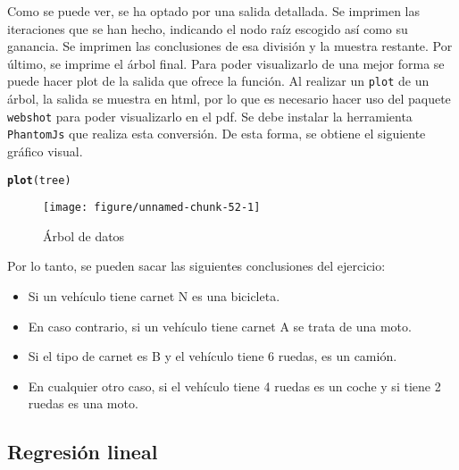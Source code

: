 \documentclass[12pt]{report}\usepackage[]{graphicx}\usepackage[dvipsnames]{xcolor}
\makeatletter
\def\maxwidth{ %
  \ifdim\Gin@nat@width>\linewidth
    \linewidth
  \else
    \Gin@nat@width
  \fi
}
\newcommand{\hlstd}[1]{\textcolor[rgb]{0.345,0.345,0.345}{#1}}%
\newcommand{\hlkwd}[1]{\textcolor[rgb]{0.737,0.353,0.396}{\textbf{#1}}}%
\newenvironment{kframe}{%
 \def\at@end@of@kframe{}%
 \ifinner\ifhmode%
  \def\at@end@of@kframe{\end{minipage}}%
  \begin{minipage}{\columnwidth}%
 \fi\fi%
 \def\FrameCommand##1{\hskip\@totalleftmargin \hskip-\fboxsep
 \colorbox{shadecolor}{##1}\hskip-\fboxsep
     \hskip-\linewidth \hskip-\@totalleftmargin \hskip\columnwidth}%
 \MakeFramed {\advance\hsize-\width
   \@totalleftmargin\z@ \linewidth\hsize
   \@setminipage}}%
 {\par\unskip\endMakeFramed%
 \at@end@of@kframe}
\newenvironment{knitrout}{}{} %
\makeatother
\begin{document}
	 			Como se puede ver, se ha optado por una salida detallada. Se imprimen las iteraciones que se han hecho, indicando el nodo raíz escogido así como su ganancia. Se imprimen las conclusiones de esa división y la muestra restante. Por último, se imprime el árbol final. Para poder visualizarlo de una mejor forma se puede hacer plot de la salida que ofrece la función. Al realizar un \texttt{plot} de un árbol, la salida se muestra en html, por lo que es necesario hacer uso del paquete \texttt{webshot} para poder visualizarlo en el pdf. Se debe instalar la herramienta \texttt{PhantomJs} que realiza esta conversión. De esta forma, se obtiene el siguiente gráfico visual.
	 			
\begin{knitrout}
\color{fgcolor}\begin{kframe}
\begin{alltt}
\hlkwd{plot}\hlstd{(tree)}
\end{alltt}
\end{kframe}\begin{figure}[H]

{\centering \texttt{[image: figure/unnamed-chunk-52-1]} 

}

\caption[Árbol de datos]{Árbol de datos}\label{fig:unnamed-chunk-52}
\end{figure}

\end{knitrout}
	 			
	 			Por lo tanto, se pueden sacar las siguientes conclusiones del ejercicio:
	 			
	 			\begin{itemize}
	 				\item Si un vehículo tiene carnet N es una bicicleta.
	 				\item En caso contrario, si un vehículo tiene carnet A se trata de una moto.
	 				\item Si el tipo de carnet es B y el vehículo tiene 6 ruedas, es un camión.
	 				\item En cualquier otro caso, si el vehículo tiene 4 ruedas es un coche y si tiene 2 ruedas es una moto.
	 			\end{itemize}				
 			
 			\subsection{Regresión lineal}
 			
\end{document}
